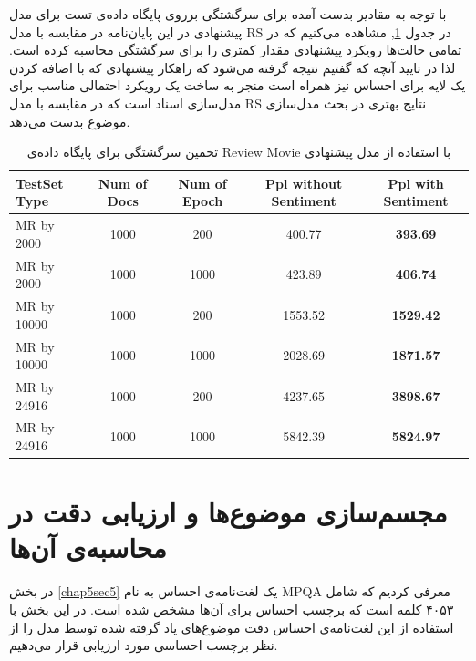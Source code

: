 با توجه به مقادير بدست آمده برای سرگشتگی برروی پایگاه داده‌ی تست برای مدل پیشنهادی در این پایان‌‌نامه در مقايسه با مدل 
RS
در جدول 
\ref{chap5-tb2},
مشاهده می‌کنيم که در تمامی حالت‌ها رويکرد پيشنهادی مقدار کمتری را برای سرگشتگی محاسبه کرده است. لذا در تایید آنچه که گفتیم نتيجه گرفته 
می‌شود که راهکار پيشنهادی که با اضافه کردن يک لايه برای احساس نيز همراه است منجر به ساخت يک رويکرد احتمالی مناسب‌ برای مدل‌سازی اسناد 
است که در مقایسه با مدل 
RS
نتایج بهتری در بحث مدل‌سازی موضوع بدست می‌دهد.

\begin{table}[!t]
	\centering
	\begin{latin}
	\begin{tabular}{|l|c|c|c|c|}
		\hline
		TestSet Type & Num of Docs & Num of Epoch & Ppl without Sentiment & Ppl with Sentiment \\
		\hline
		MR by 2000 & 1000 & 200 & 400.77 & \textbf{393.69 }\\
		\hline
		MR by 2000 & 1000 & 1000 & 423.89 & \textbf{406.74} \\
		\hline
		MR by 10000 & 1000 & 200 & 1553.52 & \textbf{1529.42} \\
		\hline
		MR by 10000 & 1000 & 1000 & 2028.69 & \textbf{1871.57} \\
		\hline
		MR by 24916 & 1000 & 200 & 4237.65 & \textbf{3898.67}\\
		\hline
		MR by 24916 & 1000 & 1000 & 5842.39 & \textbf{5824.97}\\
		\hline
	\end{tabular}
	\end{latin}
	\caption{تخمین سرگشتگی برای پایگاه داده‌ی Review Movie با استفاده از مدل پیشنهادی}
	\label{chap5-tb2}
\end{table}

\section{مجسم‌سازی موضوع‌ها و ارزیابی دقت در محاسبه‌ی آن‌ها}
\label{chap5sec8}
در بخش
\ref{chap5sec5}
یک لغت‌نامه‌ی احساس به نام
MPQA
معرفی‌ کردیم که شامل ۴۰۵۳ کلمه است که برچسب احساس برای آن‌ها مشخص شده است. در این بخش با استفاده از این لغت‌نامه‌ی احساس دقت موضوع‌های یاد گرفته شده توسط مدل را از نظر برچسب احساسی مورد ارزیابی قرار می‌‌دهیم.

